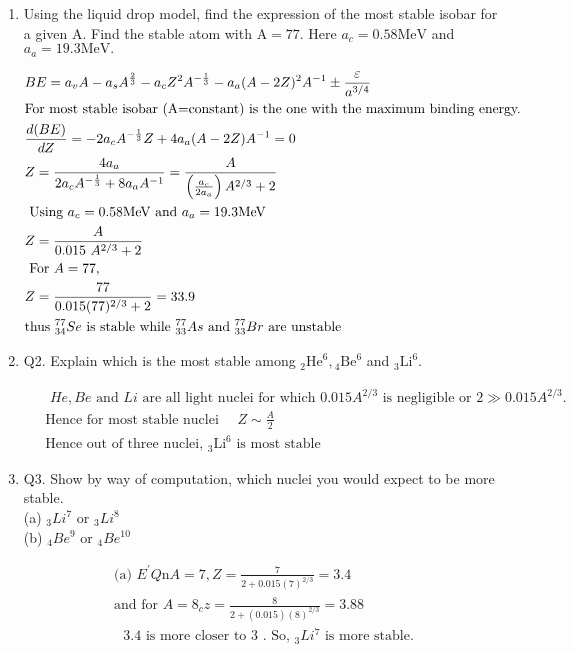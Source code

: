 \begin{enumerate}
	\item  Using the liquid drop model, find the expression of the most stable isobar for a given A. Find the stable atom with $\mathrm{A}=77$. Here $a_c=0.58 \mathrm{MeV}$ and $a_a=19.3 \mathrm{MeV} . $
	\begin{answer}
		\begin{align*}
		&B E=a_v A-a_s A^{\frac{2}{3}}-a_c Z^2 A^{-\frac{1}{3}}-a_a(A-2 Z)^2 A^{-1} \pm \frac{{\varepsilon}}{a^{3/4}}\\
		&\text{For most stable isobar (A=constant) is the one with the maximum binding energy. }\\
		&\frac{d(B E)}{d Z}=-2 a_c A^{-\frac{1}{3}} Z+4 a_a(A-2 Z) A^{-1}=0\\
		&Z=\frac{4 a_a}{2 a_c A^{-\frac{1}{3}}+8 a_{a} A^{-1}}=\frac{A}{\left(\frac{a_c}{2a_a}\right) A^{2 / 3}+2}\\
		&\text { Using } a_c=0.58 \mathrm{MeV} \text { and } a_a=19.3 \mathrm{MeV}\\
		&Z=\frac{A}{0.015 \ A^{2/3}+2}\\
		&\text { For } A=77 \text {, }\\
		&Z=\frac{77}{0.015(77)^{2 / 3}+2}=33.9\\
		&\text{thus ${}^{77}_{34}Se$ is stable while ${}^{77}_{33}As$ and $ {}^{77}_{33}Br$ are unstable}
		\end{align*}
	\end{answer}
\item Q2. Explain which is the most stable among ${ }_2 \mathrm{He}^6,{ }_4 \mathrm{Be}^6$ and ${ }_3 \mathrm{Li}^6$.
	\begin{answer}
	\begin{align*}
	&\text{ $H e, B e$ and $L i$ are all light nuclei for which $0.015 A^{2 / 3}$ is negligible or $2 \gg 0.015 A^{2 / 3}$.}\\
	&\text{	Hence for most stable nuclei $\quad Z \sim \frac{A}{2}$}\\
	&\text{	Hence out of three nuclei, ${ }_3 \mathrm{Li}^6$ is most stable}
	\end{align*}
\end{answer}
\item Q3. Show by way of computation, which nuclei you would expect to be more stable.\\
(a) ${ }_3 L i^7$ or ${ }_3 L i^8$\\
(b) ${ }_4 B e^9$ or ${ }_4 B e^{10}$ 
\begin{answer}
	\begin{align*}
	 \text{(a) $E^{\prime} Q \mathrm{n} A=7, Z=\frac{7}{2+0 .015(7)^{2/3}}=3.4$ }\\
	 \text{and for $A=8_c z=\frac{8}{2+(0.015)(8 )^{2/3}}=3.88$}\\
\text{	$3.4$ is more closer to 3 . So, ${ }_3 L i^7$ is more stable.}
	\end{align*}
\end{answer}
\end{enumerate}